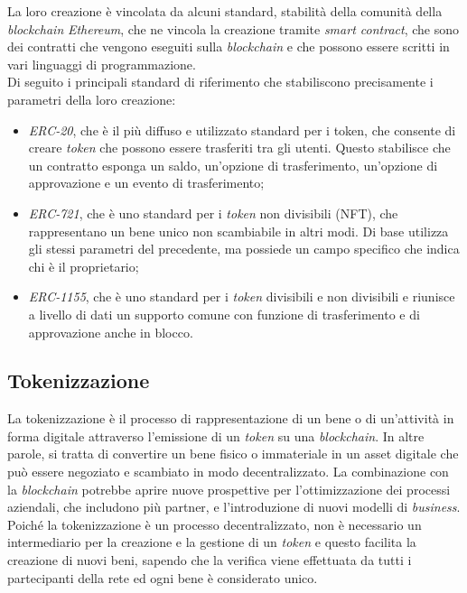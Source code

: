 La loro creazione è vincolata da alcuni standard, stabilità della comunità della \textit{blockchain} \textit{Ethereum}, che ne vincola la creazione tramite \textit{smart contract},
che sono dei contratti che vengono eseguiti sulla \textit{blockchain} e che possono essere scritti in vari linguaggi di programmazione. \\
Di seguito i principali standard di riferimento che stabiliscono precisamente i parametri della loro creazione:
\begin{itemize}
    \item \textit{ERC-20}, che è il più diffuso e utilizzato standard per i token, che consente di creare \textit{token} che possono essere trasferiti tra gli utenti. 
    Questo stabilisce che un contratto esponga un saldo, un'opzione di trasferimento, un'opzione di approvazione e un evento di trasferimento;
    \item \textit{ERC-721}, che è uno standard per i \textit{token} non divisibili (NFT), che rappresentano un bene unico non scambiabile in altri modi.
    Di base utilizza gli stessi parametri del precedente, ma possiede un campo specifico che indica chi è il proprietario;
    \item \textit{ERC-1155}, che è uno standard per i \textit{token} divisibili e non divisibili e riunisce a livello di dati un supporto comune con funzione di trasferimento e di approvazione anche in blocco.
\end{itemize} 

\subsection{Tokenizzazione}\label{sec:tecnologie-blockchain-avanziate-tokenizzazione}
La tokenizzazione è il processo di rappresentazione di un bene o di un'attività in forma digitale attraverso l'emissione di un \textit{token} su una \textit{blockchain}. 
In altre parole, si tratta di convertire un bene fisico o immateriale in un asset digitale che può essere negoziato e scambiato in modo decentralizzato.
La combinazione con la \textit{blockchain} potrebbe aprire nuove prospettive per l'ottimizzazione dei processi aziendali, che includono più partner, e l'introduzione di nuovi modelli di \textit{business}. 
Poiché la tokenizzazione è un processo decentralizzato, non è necessario un intermediario per la creazione e la gestione di un \textit{token} e questo facilita la creazione di nuovi beni,
sapendo che la verifica viene effettuata da tutti i partecipanti della rete ed ogni bene è considerato unico. \\

